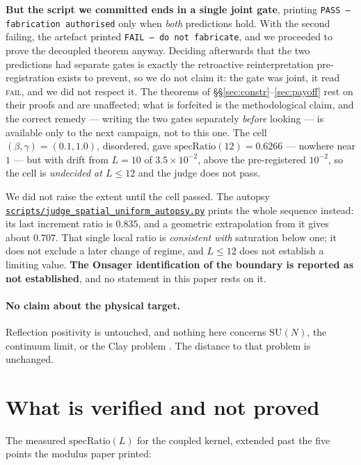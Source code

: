 \documentclass[11pt]{article}
\theoremstyle{definition}
\newcommand{\anchor}{247de2b31c8b2b6edb2cffe5fd6d96d6aa5c8a7a}
\newcommand{\repofile}[2]{%
  \href{https://github.com/lluiseriksson/THE-ERIKSSON-PROGRAMME/blob/\anchor/#1}{\nolinkurl{#2}}}
\newcommand{\SU}{\mathrm{SU}}
\begin{document}
\textbf{But the script we committed ends in a single joint gate}, printing
\texttt{PASS -- fabrication authorised} only when \emph{both} predictions hold.
With the second failing, the artefact printed \texttt{FAIL -- do not fabricate},
and we proceeded to prove the decoupled theorem anyway.  Deciding afterwards
that the two predictions had separate gates is exactly the retroactive
reinterpretation pre-registration exists to prevent, so we do not claim it:
the gate was joint, it read \textsc{fail}, and we did not respect it.  The
theorems of \S\S\ref{sec:constr}--\ref{sec:payoff} rest on their proofs and are
unaffected; what is forfeited is the methodological claim, and the correct
remedy --- writing the two gates separately \emph{before} looking --- is
available only to the next campaign, not to this one.  The cell $(\beta,\gamma)=(0.1,1.0)$, disordered, gave
$\mathrm{specRatio}(12)=0.6266$ --- nowhere near $1$ --- but with drift from
$L=10$ of $3.5\times10^{-2}$, above the pre-registered $10^{-2}$, so the cell is
\emph{undecided at $L\le12$} and the judge does not pass.

We did not raise the extent until the cell passed.  The autopsy
\repofile{scripts/judge\_spatial\_uniform\_autopsy.py}{scripts/judge\_spatial\_uniform\_autopsy.py}
prints the whole sequence instead: its last increment ratio is $0.835$, and a
geometric extrapolation from it gives about $0.707$.  That single local ratio is
\emph{consistent with} saturation below one; it does not exclude a later change
of regime, and $L\le12$ does not establish a limiting value.  \textbf{The Onsager
identification of the boundary is reported as not established}, and no statement
in this paper rests on it.

\paragraph{No claim about the physical target.}  Reflection positivity is
untouched, and nothing here concerns $\SU(N)$, the continuum limit, or the Clay
problem \cite{Clay}.  The distance to that problem is unchanged.

\section{What is verified and not proved}\label{sec:verified}

The measured $\mathrm{specRatio}(L)$ for the coupled kernel, extended past the
five points the modulus paper printed:
\end{document}
